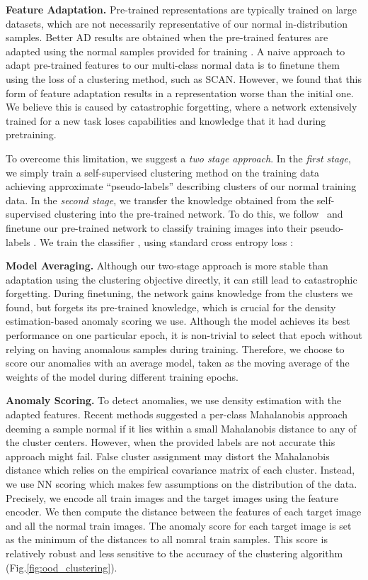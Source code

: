 \documentclass[runningheads]{llncs}
\begin{document}
\noindent\textbf{Feature Adaptation.} Pre-trained representations are typically trained on large datasets, which are not necessarily representative of our normal in-distribution samples. Better AD results are obtained when the pre-trained features are adapted using the normal samples provided for training \cite{reiss2021panda}. A naive approach to adapt pre-trained features to our multi-class normal data is to finetune them using the loss of a clustering method, such as SCAN. However, we found that this form of feature adaptation results in a representation worse  than the initial one. We believe this is caused by catastrophic forgetting, where a network extensively trained for a new task loses capabilities and knowledge that it had during pretraining.


To overcome this limitation, we suggest a \textit{two stage approach}. In the \textit{first stage}, we simply train a self-supervised clustering method on the training data  achieving approximate ``pseudo-labels'' describing clusters of our normal training data. In the \textit{second stage}, we transfer the knowledge obtained from the self-supervised clustering into the pre-trained network. To do this, we follow~\cite{fort2021exploring} and finetune our pre-trained network to classify training images into their pseudo-labels . We train the classifier  , using standard cross entropy loss : 



\noindent\textbf{Model Averaging.} Although our two-stage approach is more stable than adaptation using the clustering objective directly, it can still lead to catastrophic forgetting. During finetuning, the network gains knowledge from the clusters we found, but forgets its pre-trained knowledge, which is crucial for the density estimation-based anomaly scoring we use. Although the model achieves its best performance on one particular epoch, it is non-trivial to select that epoch without relying on having anomalous samples during training. Therefore, we choose to score our anomalies with an average model, taken as the moving average of the weights of the model during different training epochs.

\noindent\textbf{Anomaly Scoring.}
To detect anomalies, we use density estimation with the adapted features.
Recent methods suggested a per-class Mahalanobis approach \cite{fort2021exploring} deeming a sample normal if it lies within a small Mahalanobis distance to any of the cluster centers. However, when the provided labels are not accurate this approach might fail. False cluster assignment may distort the Mahalanobis distance which relies on the empirical covariance matrix of each cluster. Instead, we use NN scoring which makes few assumptions on the distribution of the data. Precisely, we encode all train images and the target images using the feature encoder. We then compute the distance between the features of each target image and all the normal train images. The anomaly score for each target image is set as the minimum of the distances to all nomral train samples. This score is relatively robust and less sensitive to the accuracy of the clustering algorithm (Fig.\ref{fig:ood_clustering}).
\end{document}
